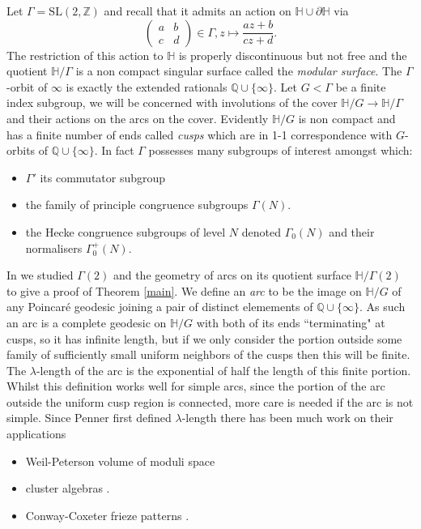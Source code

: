 \documentclass[12pt,a4paper]{amsart}
\def\HH{\mathbb{H}}
\def\dHH{\partial \mathbb{H}}
\def\g2{\Gamma(2)}
\def\xx{\HH/\g2}
\def\ZZ{\mathbb{Z}}
\def\qqq{\mathbb{Q} \cup \{\infty\}}
\def\sl2{\mathrm{SL}(2, \ZZ)}
\begin{document}
Let $\Gamma = \sl2$ and recall  that it admits an action on $\mathbb{H}\cup \dHH$ via
$$
\begin{pmatrix} a&b\\c&d \end{pmatrix} \in \Gamma,
z \mapsto \frac{az + b}{cz + d}.
$$
The restriction of this action to $\mathbb{H}$ is properly
discontinuous but not free and the quotient $\mathbb{H}/\Gamma$ is a non compact singular surface
called the \textit{modular surface}.
The $\Gamma$-orbit of $\infty$ is exactly the extended rationals $\mathbb{Q}\cup \{\infty\}$.
Let $G<\Gamma$ be a finite index subgroup, we will be concerned with involutions of the cover
$\mathbb{H}/G\rightarrow \mathbb{H}/\Gamma$ and their actions on the arcs on the cover.
Evidently $\mathbb{H}/G$ is non compact and has a finite number of
ends called \textit{cusps} which are in 1-1 correspondence 
with  $G$-orbits of $\qqq$.
In fact $\Gamma$ possesses many subgroups of interest amongst which:
\begin{itemize}
	\item $\Gamma'$ its commutator subgroup
	\item the family of principle congruence subgroups
		$\Gamma(N)$.
	\item the Hecke congruence subgroups of level $N$
		 denoted $\Gamma_0(N)$ and their normalisers
		 $\Gamma_0^+(N)$.
\end{itemize}
In \cite{vlad} we studied $\Gamma(2)$ and the geometry of arcs on its quotient surface $\xx$
to give a proof of Theorem \ref{main}.
We define an \textit{arc} to be the image on $\mathbb{H}/G$ of any
Poincaré geodesic joining  a pair of distinct elemements of $\qqq$.
As such an arc is a complete geodesic on  $\mathbb{H}/G$ with both
of its ends ``terminating" at cusps, 
so it has infinite length, but if we only consider the portion outside some
family of sufficiently small uniform neighbors of the cusps then
this will be finite. 
The $\lambda$-length
of the arc is the exponential of half the length of this finite portion.
Whilst this definition works well for simple arcs, 
since the portion of the arc
outside the uniform cusp region is connected, more care is needed if the arc is not simple.
Since Penner \cite{bob} first defined $\lambda$-length 
there has been much work on their applications

\begin{itemize}
	\item Weil-Peterson volume of moduli space \cite{bob}
	\item cluster algebras \cite{fomin}.
	\item Conway-Coxeter frieze patterns \cite{frieze}.
\end{itemize}
\end{document}

